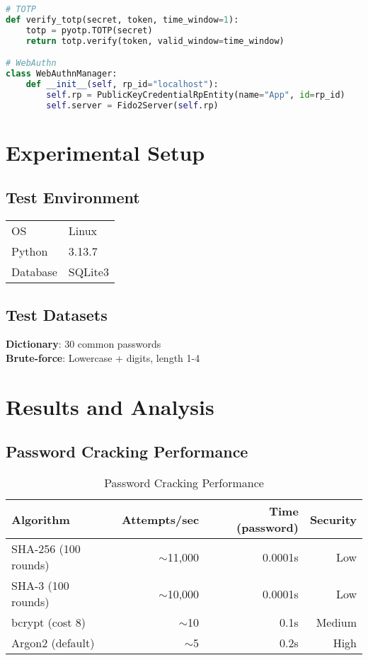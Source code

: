 \documentclass[12pt,a4paper]{article}
\begin{document}
\begin{lstlisting}[language=Python]
# TOTP
def verify_totp(secret, token, time_window=1):
    totp = pyotp.TOTP(secret)
    return totp.verify(token, valid_window=time_window)

# WebAuthn
class WebAuthnManager:
    def __init__(self, rp_id="localhost"):
        self.rp = PublicKeyCredentialRpEntity(name="App", id=rp_id)
        self.server = Fido2Server(self.rp)
\end{lstlisting}

\section{Experimental Setup}

\subsection{Test Environment}
\begin{tabular}{ll}
\toprule
OS & Linux \\
Python & 3.13.7 \\
Database & SQLite3 \\
\bottomrule
\end{tabular}

\subsection{Test Datasets}
\textbf{Dictionary}: 30 common passwords\\
\textbf{Brute-force}: Lowercase + digits, length 1-4

\section{Results and Analysis}

\subsection{Password Cracking Performance}

\begin{table}[H]
\centering
\begin{tabular}{lrrr}
\toprule
Algorithm & Attempts/sec & Time (password) & Security \\
\midrule
SHA-256 (100 rounds) & $\sim$11,000 & 0.0001s & Low \\
SHA-3 (100 rounds) & $\sim$10,000 & 0.0001s & Low \\
bcrypt (cost 8) & $\sim$10 & 0.1s & Medium \\
Argon2 (default) & $\sim$5 & 0.2s & High \\
\bottomrule
\end{tabular}
\caption{Password Cracking Performance}
\end{table}
\end{document}
